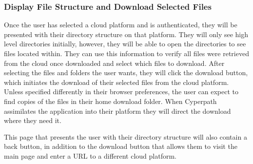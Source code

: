 \documentclass{article}
\begin{document}
            \subsubsection{Display File Structure and Download Selected Files}
            Once the user has selected a cloud platform and is authenticated, they will be presented with their directory structure on that platform. They will only see high level directories initially,
            however, they will be able to open the directories to see files located within. They can use this information to verify all files were retrieved from the cloud once downloaded and select which
            files to download. After selecting the files and folders the user wants, they will click the download button, which initiates the download of their selected files from the cloud platform.
            Unless specified differently in their browser preferences, the user can expect to find copies of the files in their home download folder.
            When Cyperpath assimilates the application into their platform they will direct the download where they need it.

            This page that presents the user with their directory structure will also contain a back button, in addition to the download button that allows them to visit the main page and enter a URL to a different
            cloud platform.

\end{document}
